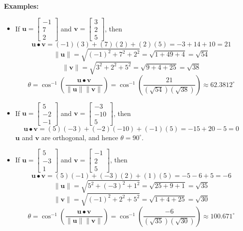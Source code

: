 \documentclass{article}
\begin{document}
\textbf{Examples:}
\begin{itemize}
\item If \(\mathbf{u} = \begin{bmatrix} -1 \\ 7 \\ 2 \end{bmatrix}\) and \(\mathbf{v} = \begin{bmatrix} 3 \\ 2 \\ 5 \end{bmatrix}\), then 
\[\mathbf{u} \bullet \mathbf{v} = (-1)(3) + (7)(2) + (2)(5) = -3 + 14 + 10 = 21\]
\[\|\mathbf{u}\| = \sqrt{(-1)^2 + 7^2 + 2^2} = \sqrt{1 + 49 + 4} = \sqrt{54}\]
\[\|\mathbf{v}\| = \sqrt{3^2 + 2^2 + 5^2} = \sqrt{9 + 4 + 25} = \sqrt{38}\]
\[\theta = \cos^{-1}\left(\frac{\mathbf{u} \bullet \mathbf{v}}{\|\mathbf{u}\| \|\mathbf{v}\|}\right) = \cos^{-1}\left(\frac{21}{(\sqrt{54})(\sqrt{38})}\right) \approx 62.3812^\circ\]
\item If \(\mathbf{u} = \begin{bmatrix} 5 \\ -2 \\ -1 \end{bmatrix}\) and \(\mathbf{v} = \begin{bmatrix} -3 \\ -10 \\ 5 \end{bmatrix}\), then 
\[\mathbf{u} \bullet \mathbf{v} = (5)(-3) + (-2)(-10) + (-1)(5) = -15 + 20 - 5 = 0\]
\(\mathbf{u}\) and \(\mathbf{v}\) are orthogonal, and hence \(\theta = 90^\circ\).
\item If \(\mathbf{u} = \begin{bmatrix} 5 \\ -3 \\ 1 \end{bmatrix}\) and \(\mathbf{v} = \begin{bmatrix} -1 \\ 2 \\ 5 \end{bmatrix}\), then 
\[\mathbf{u} \bullet \mathbf{v} = (5)(-1) + (-3)(2) + (1)(5) = -5 - 6 + 5 = -6\]
\[\|\mathbf{u}\| = \sqrt{5^2 + (-3)^2 + 1^2} = \sqrt{25 + 9 + 1} = \sqrt{35}\]
\[\|\mathbf{v}\| = \sqrt{(-1)^2 + 2^2 + 5^2} = \sqrt{1 + 4 + 25} = \sqrt{30}\]
\[\theta = \cos^{-1}\left(\frac{\mathbf{u} \bullet \mathbf{v}}{\|\mathbf{u}\| \|\mathbf{v}\|}\right) = \cos^{-1}\left(\frac{-6}{(\sqrt{35})(\sqrt{30})}\right) \approx 100.671^\circ\]
\end{itemize}
\end{document}
